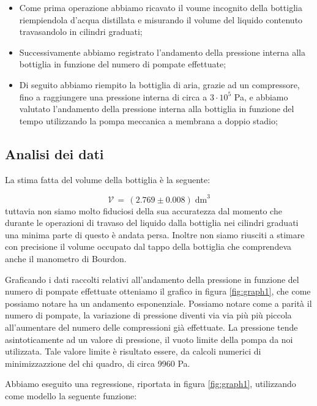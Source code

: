 \begin{itemize}
	\item{Come prima operazione abbiamo ricavato il voume incognito della bottiglia riempiendola d'acqua distillata e misurando il volume del liquido contenuto travasandolo in cilindri graduati;}
	\item{Successivamente abbiamo registrato l'andamento della pressione interna alla bottiglia in funzione del numero di pompate effettuate;}
	\item{Di seguito abbiamo riempito la bottiglia di aria, grazie ad un compressore, fino a raggiungere una pressione
	interna di circa a $3 \cdot 10^5$ \si{\pascal}, e abbiamo valutato l'andamento della pressione interna alla bottiglia
	in funzione del tempo utilizzando la pompa meccanica a membrana a doppio stadio;}
\end{itemize}

\subsection{Analisi dei dati}

La stima fatta del volume della bottiglia è la seguente:

\begin{equation}
	\mathcal{V} \, = \, (2.769 \pm 0.008) \; \si{\deci\meter}^3  
\end{equation}
%
tuttavia non siamo molto fiduciosi della sua accuratezza dal momento che durante le operazioni di travaso del liquido dalla bottiglia nei cilindri graduati una minima parte di questo è andata persa. Inoltre non siamo riusciti a stimare con precisione il volume occupato dal tappo della bottiglia che comprendeva anche il manometro di Bourdon.

Graficando i dati raccolti relativi all'andamento della pressione in funzione del numero di pompate effettuate otteniamo
il grafico in figura \ref{fig:graph1}, che come possiamo notare ha un andamento esponenziale. Possiamo notare come a parità
il numero di pompate, la variazione di pressione diventi via via più più piccola all'aumentare del numero delle
compressioni già effettuate. La pressione tende asintoticamente ad un valore di pressione, il vuoto limite della pompa
da noi utilizzata. Tale valore limite è risultato essere, da calcoli numerici di minimizzazzione del chi quadro, di circa 9960 \si{\pascal}.

Abbiamo eseguito una regressione, riportata in figura \ref{fig:graph1}, utilizzando come modello la seguente funzione:

